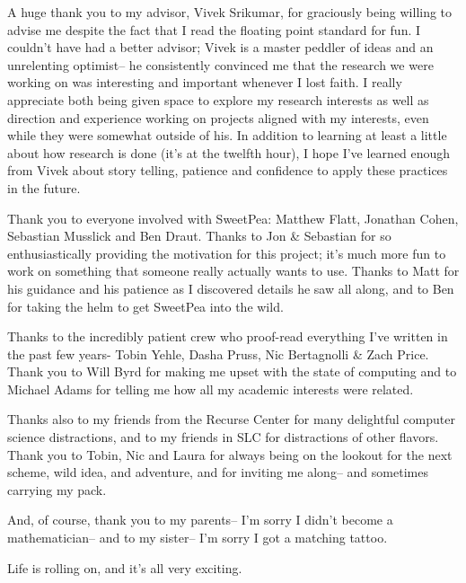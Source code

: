 
A huge thank you to my advisor, Vivek Srikumar, for graciously being willing to advise me despite the fact that I read the floating point standard for fun. I couldn't have had a better advisor; Vivek is a master peddler of ideas and an unrelenting optimist-- he consistently convinced me that the research we were working on was interesting and important whenever I lost faith. I really appreciate both being given space to explore my research interests as well as direction and experience working on projects aligned with my interests, even while they were somewhat outside of his. In addition to learning at least a little about how research is done (it's at the twelfth hour), I hope I've learned enough from Vivek about story telling, patience and confidence to apply these practices in the future.

Thank you to everyone involved with SweetPea: Matthew Flatt, Jonathan Cohen, Sebastian Musslick and Ben Draut. Thanks to Jon \& Sebastian for so enthusiastically providing the motivation for this project; it's much more fun to work on something that someone really actually wants to use. Thanks to Matt for his guidance and his patience as I discovered details he saw all along, and to Ben for taking the helm to get SweetPea into the wild.

Thanks to the incredibly patient crew who proof-read everything I've written in the past few years- Tobin Yehle, Dasha Pruss, Nic Bertagnolli \& Zach Price. Thank you to Will Byrd for making me upset with the state of computing and to Michael Adams for telling me how all my academic interests were related.

Thanks also to my friends from the Recurse Center for many delightful computer science distractions, and to my friends in SLC for distractions of other flavors. Thank you to Tobin, Nic and Laura for always being on the lookout for the next scheme, wild idea, and adventure, and for inviting me along-- and sometimes carrying my pack.

And, of course, thank you to my parents-- I'm sorry I didn't become a mathematician-- and to my sister-- I'm sorry I got a matching tattoo.

Life is rolling on, and it's all very exciting.
